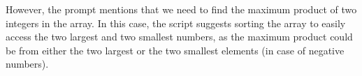\documentclass[preview]{standalone}
\begin{document}
However, the prompt mentions that we need to find the maximum product of two integers in the array. In this case, the script suggests sorting the array to easily access the two largest and two smallest numbers, as the maximum product could be from either the two largest or the two smallest elements (in case of negative numbers).\\
\end{document}
